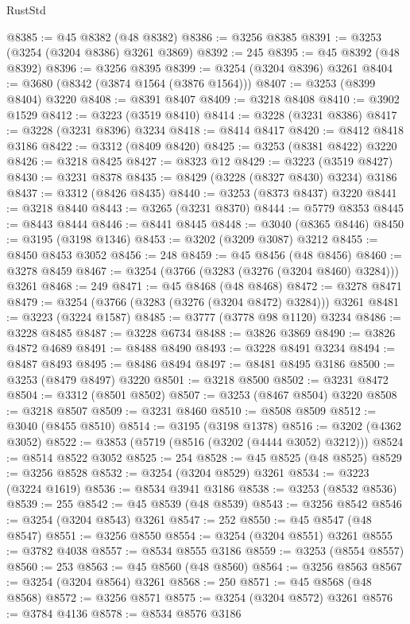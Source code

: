 \begin{lexlean}{RustStd}
\begin{coremodule}
@8385 := @45 @8382 (@48 @8382)
@8386 := @3256 @8385
@8391 := @3253 (@3254 (@3204 @8386) @3261 @3869)
@8392 := 245
@8395 := @45 @8392 (@48 @8392)
@8396 := @3256 @8395
@8399 := @3254 (@3204 @8396) @3261
@8404 := @3680 (@8342 (@3874 @1564 (@3876 @1564)))
@8407 := @3253 (@8399 @8404) @3220
@8408 := @8391 @8407
@8409 := @3218 @8408
@8410 := @3902 @1529
@8412 := @3223 (@3519 @8410)
@8414 := @3228 (@3231 @8386)
@8417 := @3228 (@3231 @8396) @3234
@8418 := @8414 @8417
@8420 := @8412 @8418 @3186
@8422 := @3312 (@8409 @8420)
@8425 := @3253 (@8381 @8422) @3220
@8426 := @3218 @8425
@8427 := @8323 @12
@8429 := @3223 (@3519 @8427)
@8430 := @3231 @8378
@8435 := @8429 (@3228 (@8327 @8430) @3234) @3186
@8437 := @3312 (@8426 @8435)
@8440 := @3253 (@8373 @8437) @3220
@8441 := @3218 @8440
@8443 := @3265 (@3231 @8370)
@8444 := @5779 @8353
@8445 := @8443 @8444
@8446 := @8441 @8445
@8448 := @3040 (@8365 @8446)
@8450 := @3195 (@3198 @1346)
@8453 := @3202 (@3209 @3087) @3212
@8455 := @8450 @8453 @3052
@8456 := 248
@8459 := @45 @8456 (@48 @8456)
@8460 := @3278 @8459
@8467 := @3254 (@3766 (@3283 (@3276 (@3204 @8460) @3284))) @3261
@8468 := 249
@8471 := @45 @8468 (@48 @8468)
@8472 := @3278 @8471
@8479 := @3254 (@3766 (@3283 (@3276 (@3204 @8472) @3284))) @3261
@8481 := @3223 (@3224 @1587)
@8485 := @3777 (@3778 @98 @1120) @3234
@8486 := @3228 @8485
@8487 := @3228 @6734
@8488 := @3826 @3869
@8490 := @3826 @4872 @4689
@8491 := @8488 @8490
@8493 := @3228 @8491 @3234
@8494 := @8487 @8493
@8495 := @8486 @8494
@8497 := @8481 @8495 @3186
@8500 := @3253 (@8479 @8497) @3220
@8501 := @3218 @8500
@8502 := @3231 @8472
@8504 := @3312 (@8501 @8502)
@8507 := @3253 (@8467 @8504) @3220
@8508 := @3218 @8507
@8509 := @3231 @8460
@8510 := @8508 @8509
@8512 := @3040 (@8455 @8510)
@8514 := @3195 (@3198 @1378)
@8516 := @3202 (@4362 @3052)
@8522 := @3853 (@5719 (@8516 (@3202 (@4444 @3052) @3212)))
@8524 := @8514 @8522 @3052
@8525 := 254
@8528 := @45 @8525 (@48 @8525)
@8529 := @3256 @8528
@8532 := @3254 (@3204 @8529) @3261
@8534 := @3223 (@3224 @1619)
@8536 := @8534 @3941 @3186
@8538 := @3253 (@8532 @8536)
@8539 := 255
@8542 := @45 @8539 (@48 @8539)
@8543 := @3256 @8542
@8546 := @3254 (@3204 @8543) @3261
@8547 := 252
@8550 := @45 @8547 (@48 @8547)
@8551 := @3256 @8550
@8554 := @3254 (@3204 @8551) @3261
@8555 := @3782 @4038
@8557 := @8534 @8555 @3186
@8559 := @3253 (@8554 @8557)
@8560 := 253
@8563 := @45 @8560 (@48 @8560)
@8564 := @3256 @8563
@8567 := @3254 (@3204 @8564) @3261
@8568 := 250
@8571 := @45 @8568 (@48 @8568)
@8572 := @3256 @8571
@8575 := @3254 (@3204 @8572) @3261
@8576 := @3784 @4136
@8578 := @8534 @8576 @3186

\end{coremodule}
\end{lexlean}
